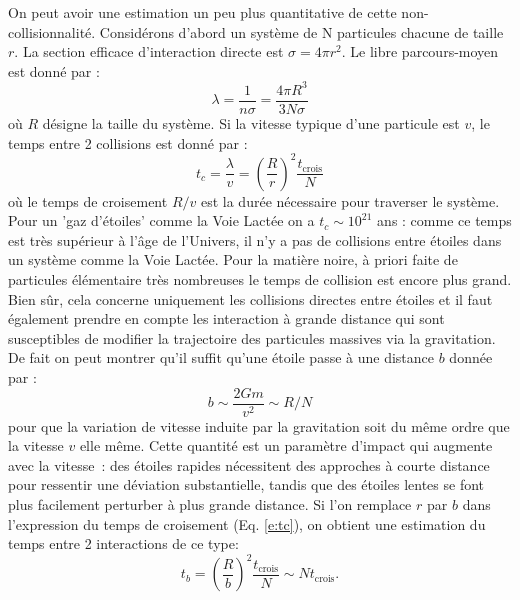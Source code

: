 On peut avoir une estimation un peu plus quantitative de cette non-collisionnalité. Considérons d'abord un système de N particules chacune de taille $r$. La section efficace d'interaction directe est $\sigma=4\pi r^2$. Le libre parcours-moyen est donné par :
\begin{equation}
\lambda=\frac{1}{n\sigma}=\frac{4\pi R^3}{3 N \sigma}
\end{equation}
où $R$ désigne la taille du système. Si la vitesse typique d'une particule est $v$, le temps entre 2 collisions est donné par :
\begin{equation}
t_c=\frac{\lambda}{v}=\left(\frac{R}{r}\right)^2 \frac{t_\mathrm{crois}}{N}
\label{e:tc}
\end{equation}
où le temps de croisement $R/v$ est la durée nécessaire pour traverser le système. Pour un 'gaz d'étoiles' comme la Voie Lactée on a $t_c\sim 10^{21}$ ans : comme ce temps est très supérieur à l'âge de l'Univers, il n'y a pas de collisions entre étoiles dans un système comme la Voie Lactée. Pour la matière noire, à priori faite de particules élémentaire très nombreuses le temps de collision est encore plus grand.
Bien sûr, cela concerne uniquement les collisions directes entre étoiles et il faut également prendre en compte les interaction à grande distance qui sont susceptibles de modifier la trajectoire des particules massives via la gravitation. De fait on peut montrer qu'il suffit qu'une étoile passe à une distance $b$ donnée par :
\begin{equation}
b\sim\frac{2Gm}{v^2}\sim R/N
\end{equation}
pour que la variation de vitesse induite par la gravitation soit du même ordre que la vitesse $v$ elle même. Cette quantité est un paramètre d'impact qui augmente avec la vitesse~: des étoiles rapides nécessitent des approches à courte distance pour ressentir une déviation substantielle, tandis que des étoiles lentes se font plus facilement perturber à plus grande distance. Si l'on remplace $r$ par $b$ dans l'expression du temps de croisement (Eq. \ref{e:tc}), on obtient une estimation du temps entre 2 interactions de ce type:
\begin{equation}
t_b=\left(\frac{R}{b}\right)^2 \frac{t_\mathrm{crois}}{N}\sim N t_\mathrm{crois}.
\end{equation}
